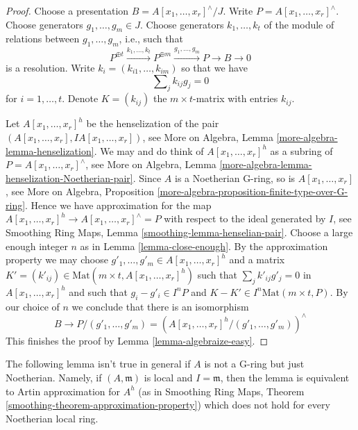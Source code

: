 \documentclass{stacks-project}
\theoremstyle{plain}
\theoremstyle{definition}
\theoremstyle{remark}
\numberwithin{equation}{subsection}
\begin{document}
\begin{proof}
Choose a presentation $B = A[x_1, \ldots, x_r]^\wedge/J$. Write
$P = A[x_1, \ldots, x_r]^\wedge$. Choose generators $g_1, \ldots, g_m \in J$.
Choose generators $k_1, \ldots, k_t$ of the module
of relations between $g_1, \ldots, g_m$, i.e., such that
$$
P^{\oplus t} \xrightarrow{k_1, \ldots, k_t}
P^{\oplus m} \xrightarrow{g_1, \ldots, g_m}
P \to B \to 0
$$
is a resolution. Write $k_i = (k_{i1}, \ldots, k_{im})$ so that we have
\begin{equation}
\label{equation-relations-straight-up}
\sum\nolimits_j k_{ij}g_j = 0
\end{equation}
for $i = 1, \ldots, t$. Denote $K = (k_{ij})$ the $m \times t$-matrix
with entries $k_{ij}$.

\medskip\noindent
Let $A[x_1, \ldots, x_r]^h$ be the henselization of the
pair $(A[x_1, \ldots, x_r], IA[x_1, \ldots, x_r])$, see
More on Algebra, Lemma \ref{more-algebra-lemma-henselization}.
We may and do think of $A[x_1, \ldots, x_r]^h$ as a subring
of $P = A[x_1, \ldots, x_r]^\wedge$, see
More on Algebra, Lemma
\ref{more-algebra-lemma-henselization-Noetherian-pair}.
Since $A$ is a Noetherian G-ring, so is $A[x_1, \ldots, x_r]$, see
More on Algebra, Proposition
\ref{more-algebra-proposition-finite-type-over-G-ring}.
Hence we have approximation for the map
$A[x_1, \ldots, x_r]^h \to A[x_1, \ldots, x_r]^\wedge = P$
with respect to the ideal generated by $I$, see
Smoothing Ring Maps, Lemma \ref{smoothing-lemma-henselian-pair}.
Choose a large enough integer $n$ as in Lemma \ref{lemma-close-enough}.
By the approximation property we may choose
$g'_1, \ldots, g'_m \in A[x_1, \ldots, x_r]^h$
and a matrix
$K' = (k'_{ij}) \in \text{Mat}(m \times t, A[x_1, \ldots, x_r]^h)$
such that $\sum\nolimits_j k'_{ij}g'_j = 0$ in
$A[x_1, \ldots, x_r]^h$ and such that
$g_i - g'_i \in I^nP$ and $K - K' \in I^n\text{Mat}(m \times t, P)$.
By our choice of $n$ we conclude that there is an isomorphism
$$
B \to P/(g'_1, \ldots, g'_m) =
\left(A[x_1, \ldots, x_r]^h/(g'_1, \ldots, g'_m)\right)^\wedge
$$
This finishes the proof by Lemma \ref{lemma-algebraize-easy}.
\end{proof}

\noindent
The following lemma isn't true in general if $A$ is not a G-ring
but just Noetherian. Namely, if $(A, \mathfrak m)$ is local
and $I = \mathfrak m$, then the lemma is equivalent to 
Artin approximation for $A^h$ (as in
Smoothing Ring Maps, Theorem \ref{smoothing-theorem-approximation-property})
which does not hold for every Noetherian local ring.
\end{document}
